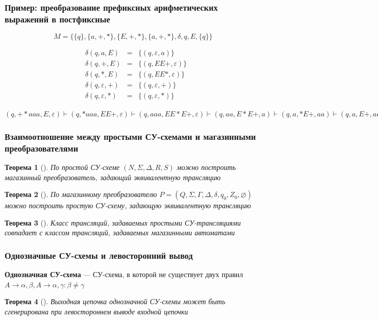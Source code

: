\documentclass{beamer}
\newtheorem{rutheorem}{Теорема}
\begin{document}
\begin{frame}[fragile]
  \transwipe[direction=90]
  \frametitle{Пример: преобразование префиксных арифметических выражений в постфиксные}
$$M = \{ \{ q \}, \{ a, +, * \}, \{ E, +, * \}, \{ a, +, * \}, \delta, q, E, \{ q \} \}$$

$$
\begin{array}{crcl}
&\delta(q, a, E)& = & \{ (q, \varepsilon, a) \} \\
&\delta(q, +, E)& = & \{ (q, EE+, \varepsilon) \} \\
&\delta(q, *, E)& = & \{ (q, EE*, \varepsilon) \} \\
&\delta(q, \varepsilon, +)& = & \{ (q, \varepsilon, +) \} \\
&\delta(q, \varepsilon, *)& = & \{ (q, \varepsilon, *) \}
\end{array}
$$

\vfill

$(q, +*aaa, E, \varepsilon) \vdash (q, *aaa, EE+, \varepsilon) \vdash (q, aaa, EE*E+, \varepsilon) \vdash (q, aa, E*E+, a) \vdash (q, a, *E+, aa) \vdash (q, a, E+, aa*) \vdash (q, \varepsilon, +, aa*a) \vdash (q, \varepsilon, \varepsilon, aa*a+)$
\end{frame}

\begin{frame}[fragile]
  \transwipe[direction=90]
  \frametitle{Взаимоотношение между простыми СУ-схемами и магазинными преобразователями}
  \begin{rutheorem}[]
  	По простой СУ-схеме $( N, \Sigma, \Delta, R, S )$  можно построить магазинный преобразователь, задающий эквивалентную трансляцию
  \end{rutheorem}

  \vfill

  \begin{rutheorem}[]
    По магазинному преобразователю $P = (Q, \Sigma, \Gamma, \Delta, \delta, q_0, Z_0, \varnothing) $ можно построить простую СУ-схему, задающую эквивалентную трансляцию
  \end{rutheorem}

  \vfill

  \begin{rutheorem}[]
    Класс трансляций, задаваемых простыми СУ-трансляциями совпадает с классом трансляций, задаваемых магазинными автоматами
  \end{rutheorem}
\end{frame}


\begin{frame}[fragile]
  \transwipe[direction=90]
  \frametitle{Однозначные СУ-схемы и левосторонний вывод}

\begin{center}
  \textbf{Однозначная СУ-схема} --- СУ-схема, в которой не существует двух правил $A \rightarrow \alpha, \beta, A \rightarrow \alpha, \gamma: \beta \neq \gamma$
\end{center}

\vfill

\begin{rutheorem}[]
Выходная цепочка однозначной СУ-схемы может быть сгенерирована при левостороннем выводе входной цепочки
\end{rutheorem}

\end{frame}
\end{document}
